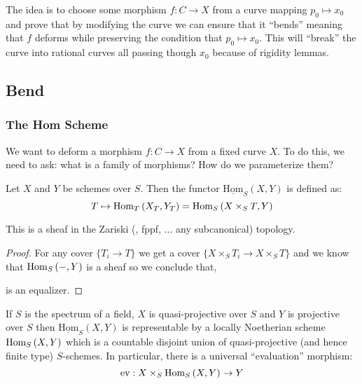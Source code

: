 \documentclass[12pt]{article}
\newcommand{\uHom}[3]{\underline{\mathrm{Hom}}_{#1}\left(#2, #3\right)}
\begin{document}
\begin{rmk}
The idea is to choose some morphism $f : C \to X$ from a curve mapping $p_0 \mapsto x_0$ and prove that by modifying the curve we can ensure that it ``bends'' meaning that $f$ deforms while preserving the condition that $p_0 \mapsto x_0$. This will ``break'' the curve into rational curves all passing though $x_0$ because of rigidity lemmas.
\end{rmk}

\subsection{Bend}

\subsubsection{The Hom Scheme}

\begin{rmk}
We want to deform a morphism $f : C \to X$ from a fixed curve $X$. To do this, we need to ask: what is a family of morphisms? How do we parameterize them? 
\end{rmk}

\begin{defn}
Let $X$ and $Y$ be schemes over $S$. Then the functor $\uHom{S}{X}{Y}$ is defined as:
\[ T \mapsto \mathrm{Hom}_{T} \left( X_T, Y_T \right) = \mathrm{Hom}_{S} \left( X \times_S T, Y \right) \]
\end{defn}

\begin{prop}
This is a sheaf in the Zariski (\etale, fppf, ... any subcanonical) topology.
\end{prop}

\begin{proof}
For any cover $\{ T_i \to T \}$ we get a cover $\{ X \times_S T_i \to X \times_S T \}$ and we know that $\mathrm{Hom}_{S} \left( -, Y \right)$ is a sheaf so we conclude that,
\begin{center}
\end{center}
is an equalizer.
\end{proof}

\begin{prop}
If $S$ is the spectrum of a field, $X$ is quasi-projective over $S$ and $Y$ is projective over $S$ then $\uHom{S}{X}{Y}$ is representable by a locally Noetherian scheme $\mathrm{Hom}_{S} \left( X, Y \right)$ which is a countable disjoint union of quasi-projective (and hence finite type) $S$-schemes. In particular, there is a universal ``evaluation'' morphism:
\[ \mathrm{ev} : X \times_S \mathrm{Hom}_{S} \left( X, Y \right) \to Y \]
\end{prop}
\end{document}

